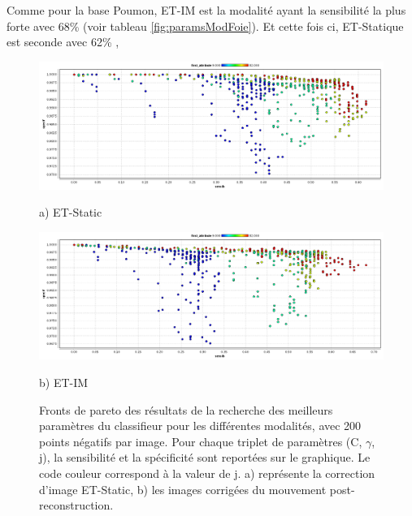 Comme pour la base Poumon, ET-IM est la modalité ayant la sensibilité la plus forte avec 68\% (voir tableau \ref{fig:paramsModFoie}). Et cette fois ci, ET-Statique est seconde avec 62\% , 

\begin{figure}[h!]

\begin{center}
 \includegraphics[width=14cm]{images/pareto_mod_Static19.png}

{\small a) ET-Static}
\vspace{0.5cm}

 \includegraphics[width=14cm]{images/pareto_mod_IM19.png}

{\small b) ET-IM}

\end{center}
 \caption{Fronts de pareto des résultats de la recherche des meilleurs paramètres du classifieur pour les différentes modalités, avec 200 points négatifs par image. Pour chaque triplet de paramètres (C, $\gamma$, j), la sensibilité et la spécificité sont reportées sur le graphique. Le code couleur correspond à la valeur de j. a) représente la correction d'image ET-Static, b) les images corrigées du mouvement post-reconstruction.}
\label{fig:paretoModalite19_1}
\end{figure}

